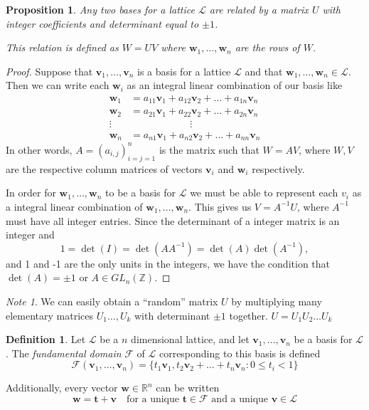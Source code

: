 \documentclass[12pt]{amsart}
\newtheorem{proposition}[theorem]{Proposition}
\theoremstyle{definition}
\newtheorem*{definition}{Definition}
\theoremstyle{remark}
\newtheorem*{note}{Note}
\newcommand{\Z}{\mathbb{Z}}
\begin{document}
\begin{proposition}
Any two bases for a lattice $\mathcal{L}$ are related by a matrix $U$ with integer coefficients and determinant equal to $\pm 1$. \cite{DecadeSum}

This relation is defined as $W = UV$ where $\bm{w}_1,\dots,\bm{w}_n$ are the rows of $W$.
\end{proposition}
\begin{proof}
    Suppose that $\bm{v}_1,\dots,\bm{v}_n$ is a basis for a lattice $\mathcal{L}$ and that $\bm{w}_1,\dots,\bm{w}_n\in\mathcal{L}$. Then we can write each $\bm{w}_i$ as an integral linear combination of our basis like
    \begin{align*}
        \bm{w}_1 &= a_{11}\bm{v}_1 + a_{12}\bm{v}_2 + \dots + a_{1n}\bm{v}_n\\
        \bm{w}_2 &= a_{21}\bm{v}_1 + a_{22}\bm{v}_2 + \dots + a_{2n}\bm{v}_n\\
        \vdots \text{ }&\qquad\qquad\qquad \vdots\\
        \bm{w}_n &= a_{n1}\bm{v}_1 + a_{n2}\bm{v}_2 + \dots + a_{nn}\bm{v}_n
    \end{align*}
    In other words, $A = (a_{i,j})_{i=j=1}^n$ is the matrix such that $W = AV$, where $W,V$ are the respective column matrices of vectors $\bm{v}_i$ and $\bm{w}_i$ respectively.
    
    In order for $\bm{w}_1,\dots,\bm{w}_n$ to be a basis for $\mathcal{L}$ we must be able to represent each $v_i$ as a integral linear combination of $\bm{w}_1,\dots,\bm{w}_n$. This gives us $V = A^{-1}U$, where $A^{-1}$ must have all integer entries. Since the determinant of a integer matrix is an integer and 
    $$1 = \det(I) = \det(AA^{-1}) = \det(A)\det(A^{-1}),$$
    and 1 and -1 are the only units in the integers, we have the condition that $\det(A)=\pm 1$ or $A \in GL_{n}(\Z).$
\end{proof}

\begin{note}
We can easily obtain a ``random'' matrix $U$ by multiplying many elementary matrices $U_1\dots,U_k$ with determinant $\pm1$ together. $U = U_1U_2\dots U_k$
\end{note}

\begin{definition}
Let $\mathcal{L}$ be a $n$ dimensional lattice, and let $\bm{v}_1,\dots,\bm{v}_n$ be a basis for $\mathcal{L}$. The \textit{fundamental domain} $\mathcal{F}$ of $\mathcal{L}$ corresponding to this basis is defined 
$$\mathcal{F}(\bm{v}_1,\dots,\bm{v}_n) = \{ t_1\bm{v}_1, t_2\bm{v}_2 + \dots + t_n\bm{v}_n : 0\leq t_i < 1\}$$

\noindent Additionally, every vector $\bm{w}\in\mathbb{R}^n$ can be written \cite{DecadeSum}
$$\bm{w} = \bm{t} + \bm{v} \quad \text{for a unique } \bm{t}\in\mathcal{F} \text{ and a unique } \bm{v}\in\mathcal{L}$$
\end{definition}
\end{document}
